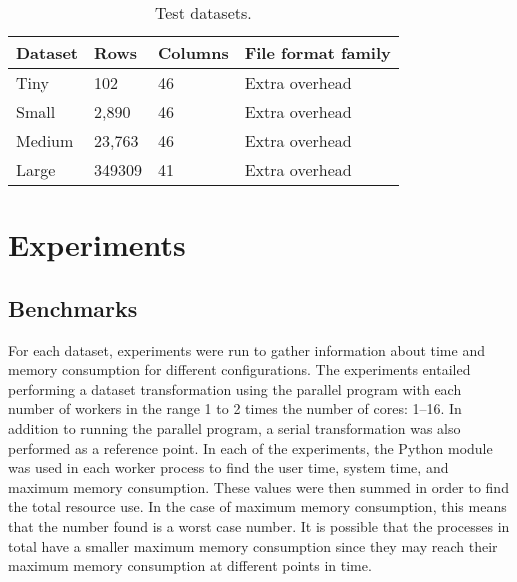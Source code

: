 \begin{table}[ht]
\centering
\begin{tabular}{|l|l|l|l|}
\hline
Dataset & Rows   & Columns & File format family \\ \hline
Tiny    & 102    & 46      & Extra overhead     \\ \hline
Small   & 2,890  & 46      & Extra overhead     \\ \hline
Medium  & 23,763 & 46      & Extra overhead     \\ \hline
Large  & 349309 & 41      & Extra overhead     \\ \hline
\end{tabular}
\label{fig:test_datasets}
\caption{Test datasets.}
\end{table}

\section{Experiments}
\subsection{Benchmarks}
For each dataset, experiments were run to gather information about time and memory consumption for different configurations.
The experiments entailed performing a dataset transformation using the parallel program with each number of workers in the range 1 to 2 times the number of cores: 1--16.
In addition to running the parallel program, a serial transformation was also performed as a reference point.
In each of the experiments, the Python  module was used in each worker process to find the user time, system time, and maximum memory consumption.
These values were then summed in order to find the total resource use. In the case of maximum memory consumption, this means that the number found is a worst case
number. It is possible that the processes in total have a smaller maximum memory consumption since they may reach their maximum memory consumption at different
points in time.

